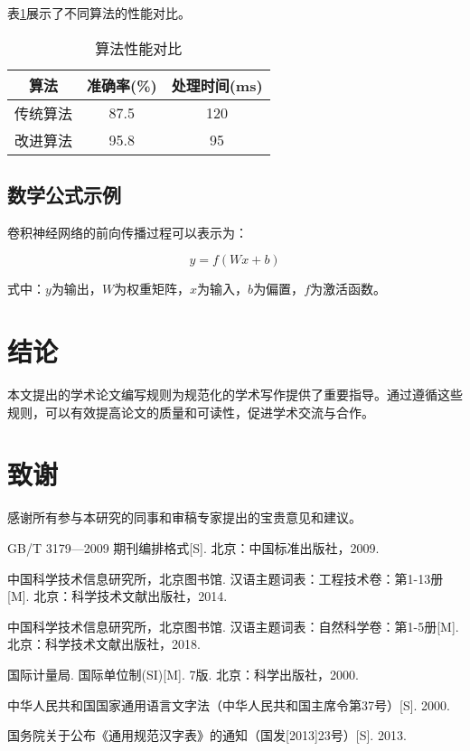 \documentclass[a4paper,12pt]{ctexart}
\newenvironment{acknowledgments}{
    \section*{\heiti\zihao{-4} 致谢}
    \zihao{5}\kaishu
}{}
\begin{document}
表\ref{tab:example}展示了不同算法的性能对比。

\begin{table}[htbp]
\centering
\caption{算法性能对比}
\label{tab:example}
\begin{tabular}{ccc}
\toprule
\textbf{算法} & \textbf{准确率(\%)} & \textbf{处理时间(ms)} \\
\midrule
传统算法 & 87.5 & 120 \\
改进算法 & 95.8 & 95 \\
\bottomrule
\end{tabular}
\end{table}

\subsection{数学公式示例}

卷积神经网络的前向传播过程可以表示为：

\begin{equation}
y = f(Wx + b)
\label{eq:forward}
\end{equation}

式中：$y$为输出，$W$为权重矩阵，$x$为输入，$b$为偏置，$f$为激活函数。

\section{结论}

本文提出的学术论文编写规则为规范化的学术写作提供了重要指导。通过遵循这些规则，可以有效提高论文的质量和可读性，促进学术交流与合作。

\begin{acknowledgments}
感谢所有参与本研究的同事和审稿专家提出的宝贵意见和建议。
\end{acknowledgments}

\newpage
\begin{thebibliography}{99}

GB/T 3179—2009 期刊编排格式[S]. 北京：中国标准出版社，2009.

中国科学技术信息研究所，北京图书馆. 汉语主题词表：工程技术卷：第1-13册[M]. 北京：科学技术文献出版社，2014.

中国科学技术信息研究所，北京图书馆. 汉语主题词表：自然科学卷：第1-5册[M]. 北京：科学技术文献出版社，2018.

国际计量局. 国际单位制(SI)[M]. 7版. 北京：科学出版社，2000.

中华人民共和国国家通用语言文字法（中华人民共和国主席令第37号）[S]. 2000.

国务院关于公布《通用规范汉字表》的通知（国发[2013]23号）[S]. 2013.

\end{thebibliography}
\end{document}
